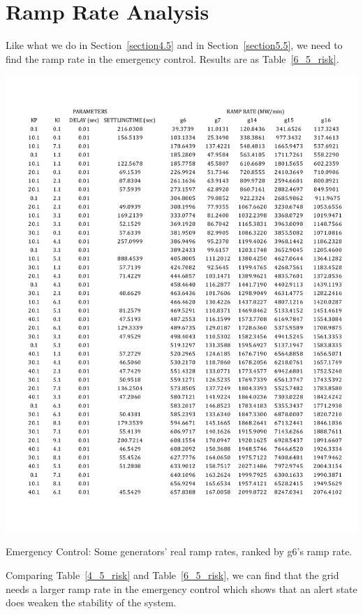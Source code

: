 \section{Ramp Rate Analysis} %

Like what we do in Section~\ref{section4.5} and in Section~\ref{section5.5}, we need to find the ramp rate in the emergency control. Results are as Table~\ref{6_5_risk}.


\begin{table}[htbp]
\centering
\includegraphics[width = \textwidth]{figure/6_5_risk.pdf}
\caption{Emergency Control: Some generators' real ramp rates, ranked by g6's ramp rate.}
\label{6_5_risk}
\end{table}

Comparing Table~\ref{4_5_risk} and Table~\ref{6_5_risk}, we can find that the grid needs a larger ramp rate in the emergency control which shows that an alert state does weaken the stability of the system.